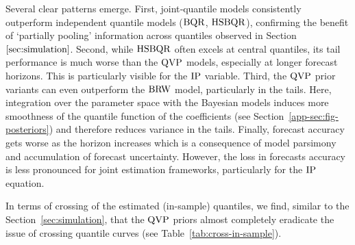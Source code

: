 Several clear patterns emerge. First, joint‐quantile models consistently outperform independent quantile models ($\operatorname{BQR}$, $\operatorname{HSBQR}$), confirming the benefit of `partially pooling' information across quantiles observed in Section~$\ref{sec:simulation}$. Second, while $\operatorname{HSBQR}$ often excels at central quantiles, its tail performance is much worse than the $\operatorname{QVP}$ models, especially at longer forecast horizons. This is particularly visible for the $\operatorname{IP}$ variable. Third, the $\operatorname{QVP}$ prior variants can even outperform the $\operatorname{BRW}$ model, particularly in the tails. Here, integration over the parameter space with the Bayesian models induces more smoothness of the quantile function of the coefficients (see Section~\ref{app-sec:fig-posteriors}) and therefore reduces variance in the tails. Finally, forecast accuracy gets worse as the horizon increases which is a consequence of model parsimony and accumulation of forecast uncertainty. However, the loss in forecasts accuracy is less pronounced for joint estimation frameworks, particularly for the $\operatorname{IP}$ equation. %
%

In terms of crossing of the estimated (in-sample) quantiles, we find, similar to the Section~\ref{sec:simulation}, that the $\operatorname{QVP}$ priors almost completely eradicate the issue of crossing quantile curves (see Table~\ref{tab:cross-in-sample}). %



